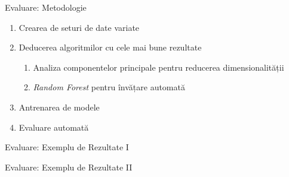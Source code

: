 \begin{frame}{Evaluare: Metodologie} \pause
    \begin{enumerate}
	    \item Crearea de seturi de date variate \pause
	    \item Deducerea algoritmilor cu cele mai bune rezultate \pause
	        \begin{enumerate}
	            \item Analiza componentelor principale pentru reducerea dimensionalității \pause
	            \item \textit{Random Forest} pentru învățare automată \pause
	        \end{enumerate}
	    \item Antrenarea de modele \pause
	    \item Evaluare automată
	\end{enumerate}
\end{frame}

\begin{frame}{Evaluare: Exemplu de Rezultate I} \pause
     \pause
    
\end{frame}

\begin{frame}{Evaluare: Exemplu de Rezultate II}
    
\end{frame}